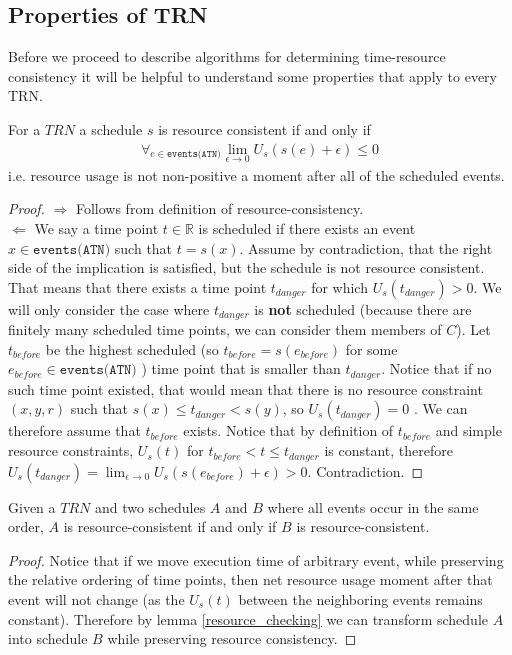 \subsection{Properties of TRN}
Before we proceed to describe algorithms for determining time-resource consistency it will be helpful to understand some properties that apply to every TRN.
\begin{lemma}
\label{resource_checking}
For a $TRN$ a schedule $s$ is resource consistent if and only if
\begin{align}
\label{eq:resource_consistency}\forall_{e \in \texttt{events(ATN)}} \lim_{\epsilon \to 0} U_s(s(e) + \epsilon) \leq 0
\end{align}
i.e. resource usage is not non-positive a moment after all of the scheduled events.
\end{lemma}
\begin{proof}
$\Rightarrow$ Follows from definition of resource-consistency.\\
$\Leftarrow$ We say a time point $t \in \mathbb{R}$ is scheduled if there exists an event  $x \in \texttt{events(ATN)}$ such that $t = s(x)$. Assume by contradiction, that the right side of the implication is satisfied, but the schedule is not resource consistent. That means that there exists a time point $t_{danger}$ for which $U_s(t_{danger}) > 0 $. We will only consider the case where $t_{danger}$ is \textbf{not} scheduled (because there are finitely many scheduled time points, we can consider them members of $C$). Let $t_{before}$ be the highest scheduled (so $t_{before}=s(e_{before})$ for some $e_{before} \in \texttt{events(ATN)}$ ) time point that is smaller than $t_{danger}$. Notice that if no such time point existed, that would mean that there is no resource constraint $(x,y,r)$ such that $s(x) \leq t_{danger} < s(y)$, so $U_s(t_{danger})=0$ . We can therefore assume that $t_{before}$ exists. Notice that by definition of $t_{before}$ and simple resource constraints, $U_s(t)$ for $t_{before} < t \leq t_{danger}$ is constant, therefore $U_s(t_{danger}) = \lim_{\epsilon \to 0} U_s(s(e_{before}) + \epsilon) > 0$. Contradiction.

\end{proof}
\begin{corollary}
\label{cor:ordering}
Given a $TRN$ and two schedules $A$ and $B$ where all events occur in the same order, $A$ is resource-consistent if and only if $B$ is resource-consistent.
\end{corollary}
\begin{proof}
Notice that if we move execution time of arbitrary event, while preserving the relative ordering of time points, then net resource usage moment after that event will not change (as the $U_s(t)$ between the neighboring events remains constant). Therefore by lemma \ref{resource_checking} we can transform schedule $A$ into schedule $B$ while preserving resource consistency.
\end{proof}
